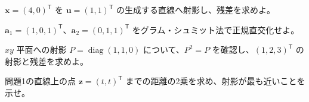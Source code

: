 \documentclass[11pt]{article}
\begin{document}

\problem[直線への射影]
$\boldsymbol x=(4,0)^{\mathsf T}$ を $\boldsymbol u=(1,1)^{\mathsf T}$ の生成する直線へ射影し、残差を求めよ。
\workspace{38mm}

\problem[正規直交化]
$\boldsymbol a_1=(1,0,1)^{\mathsf T}$、$\boldsymbol a_2=(0,1,1)^{\mathsf T}$ をグラム・シュミット法で正規直交化せよ。
\workspace{38mm}
\newpage

\problem[射影行列]
$xy$ 平面への射影 $P=\operatorname{diag}(1,1,0)$ について、$P^2=P$ を確認し、$(1,2,3)^{\mathsf T}$ の射影と残差を求めよ。
\workspace{38mm}

\problem[最短距離]
問題1の直線上の点 $\boldsymbol z=(t,t)^{\mathsf T}$ までの距離の2乗を求め、射影が最も近いことを示せ。
\workspace{38mm}
\end{document}
